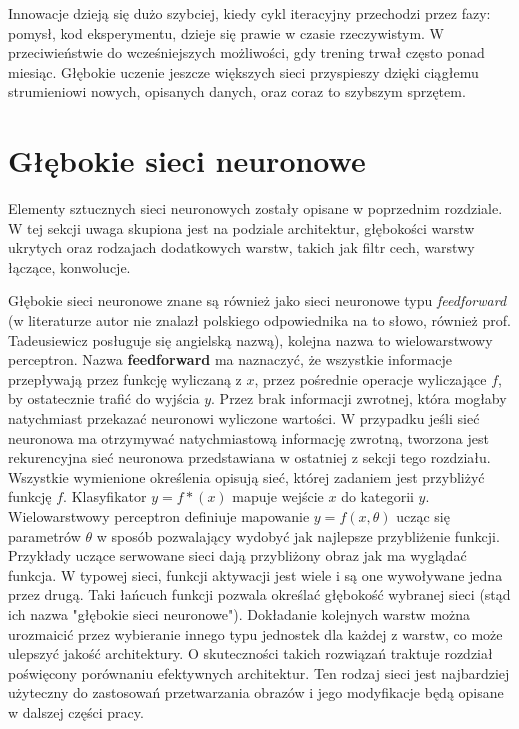 \documentclass[12pt,a4paper,twoside,titlepage,openright]{book}
\begin{document}
\begin{itemize}
Innowacje dzieją się dużo szybciej, kiedy cykl iteracyjny przechodzi przez fazy: pomysł, kod eksperymentu, dzieje się prawie w czasie rzeczywistym. W przeciwieństwie do wcześniejszych możliwości, gdy trening trwał często ponad miesiąc. Głębokie uczenie jeszcze większych sieci przyspieszy dzięki ciągłemu strumieniowi nowych, opisanych danych, oraz coraz to szybszym sprzętem.

\section{Głębokie sieci neuronowe}
Elementy sztucznych sieci neuronowych zostały opisane w poprzednim rozdziale. W tej sekcji uwaga skupiona jest na podziale architektur, głębokości warstw ukrytych oraz rodzajach dodatkowych warstw, takich jak filtr cech, warstwy łączące, konwolucje.

Głębokie sieci neuronowe znane są również jako sieci neuronowe typu \textit{feedforward} (w literaturze autor nie znalazł polskiego odpowiednika na to słowo, również prof. Tadeusiewicz posługuje się angielską nazwą), kolejna nazwa to wielowarstwowy perceptron. Nazwa \textbf{feedforward} ma naznaczyć, że wszystkie informacje przepływają przez funkcję wyliczaną z \(x\), przez pośrednie operacje wyliczające \(f\), by ostatecznie trafić do wyjścia \(y\). Przez brak informacji zwrotnej, która mogłaby natychmiast przekazać neuronowi wyliczone wartości. W przypadku jeśli sieć neuronowa ma otrzymywać natychmiastową informację zwrotną, tworzona jest rekurencyjna sieć neuronowa przedstawiana w ostatniej z sekcji tego rozdziału. Wszystkie wymienione określenia opisują sieć, której zadaniem jest przybliżyć funkcję \(f\). Klasyfikator \(y = f*(x) \) mapuje wejście \(x\) do kategorii \(y\). Wielowarstwowy perceptron definiuje mapowanie \(y = f(x,\theta)\) ucząc się parametrów \(\theta\) w sposób pozwalający wydobyć jak najlepsze przybliżenie funkcji. Przykłady uczące serwowane sieci dają przybliżony obraz jak ma wyglądać funkcja. W typowej sieci, funkcji aktywacji jest wiele i są one wywoływane jedna przez drugą. Taki łańcuch funkcji pozwala określać głębokość wybranej sieci (stąd ich nazwa "głębokie sieci neuronowe"). Dokładanie kolejnych warstw można urozmaicić przez wybieranie innego typu jednostek dla każdej z warstw, co może ulepszyć jakość architektury. O skuteczności takich rozwiązań traktuje rozdział poświęcony porównaniu efektywnych architektur. Ten rodzaj sieci jest najbardziej użyteczny do zastosowań przetwarzania obrazów i jego modyfikacje będą opisane w dalszej części pracy.


\end{itemize}
\end{document}
